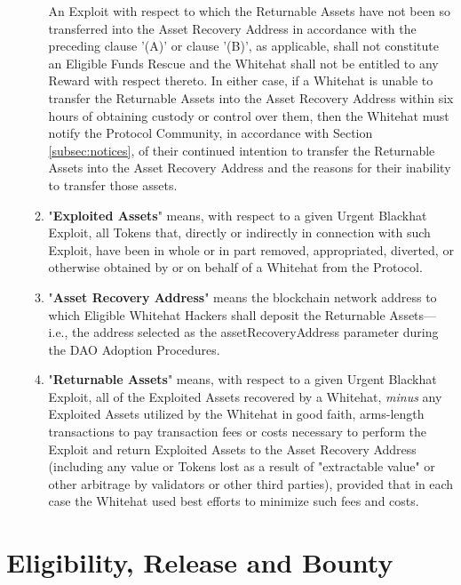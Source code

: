 \documentclass{article}
\begin{document}
\begin{enumerate}
\begin{enumerate}
                    An Exploit with respect to which the Returnable Assets have not been so transferred into the Asset Recovery Address in accordance with the preceding clause '(A)' or clause '(B)', as applicable, shall not constitute an Eligible Funds Rescue and the Whitehat shall not be entitled to any Reward with respect thereto. In either case, if a Whitehat is unable to transfer the Returnable Assets into the Asset Recovery Address within six hours of obtaining custody or control over them, then the Whitehat must notify the Protocol Community, in accordance with Section \ref{subsec:notices}, of their continued intention to transfer the Returnable Assets into the Asset Recovery Address and the reasons for their inability to transfer those assets.

              \item "\textbf{Exploited Assets}" means, with respect to a given Urgent Blackhat Exploit, all Tokens that, directly or indirectly in connection with such Exploit, have been in whole or in part removed, appropriated, diverted, or otherwise obtained by or on behalf of a Whitehat from the Protocol.

              \item "\textbf{Asset Recovery Address}" means the blockchain network address to which Eligible Whitehat Hackers shall deposit the Returnable Assets—i.e., the address selected as the assetRecoveryAddress parameter during the DAO Adoption Procedures.

              \item "\textbf{Returnable Assets}" means, with respect to a given Urgent Blackhat Exploit, all of the Exploited Assets recovered by a Whitehat, \textit{minus} any Exploited Assets utilized by the Whitehat in good faith, arms-length transactions to pay transaction fees or costs necessary to perform the Exploit and return Exploited Assets to the Asset Recovery Address (including any value or Tokens lost as a result of "extractable value" or other arbitrage by validators or other third parties), provided that in each case the Whitehat used best efforts to minimize such fees and costs.

          \end{enumerate}
\end{enumerate}

\section{Eligibility, Release and Bounty}\label{sec:eligibility}
\end{document}
